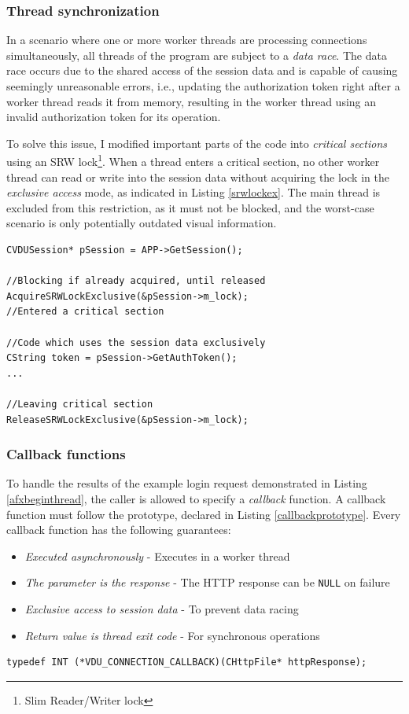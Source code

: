 \subsubsection{Thread synchronization}
In a scenario where one or more worker threads are processing connections simultaneously, all threads of the program are subject to a \textit{data race}. The data race occurs due to the shared access of the session data and is capable of causing seemingly unreasonable errors, i.e., updating the authorization token right after a worker thread reads it from memory, resulting in the worker thread using an invalid authorization token for its operation.

To solve this issue, I modified important parts of the code into \textit{critical sections} using an SRW lock\footnote{Slim Reader/Writer lock}. When a thread enters a critical section, no other worker thread can read or write into the session data without acquiring the lock in the \textit{exclusive access} mode, as indicated in Listing \ref{srwlockex}. The main thread is excluded from this restriction, as it must not be blocked, and the worst-case scenario is only potentially outdated visual information.

\begin{lstlisting}[caption={Example of a critical section implementation using an SRW lock.}, label=srwlockex]
CVDUSession* pSession = APP->GetSession();

//Blocking if already acquired, until released
AcquireSRWLockExclusive(&pSession->m_lock);
//Entered a critical section

//Code which uses the session data exclusively
CString token = pSession->GetAuthToken();
...

//Leaving critical section
ReleaseSRWLockExclusive(&pSession->m_lock);
\end{lstlisting}

\subsubsection{Callback functions}
To handle the results of the example login request demonstrated in Listing \ref{afxbeginthread}, the caller is allowed to specify a \textit{callback} function. A callback function must follow the prototype, declared in Listing \ref{callbackprototype}. Every callback function has the following guarantees:
\begin{itemize}
    \item \textit{Executed asynchronously} - Executes in a worker thread 
    \item \textit{The parameter is the response} - The HTTP response can be \lstinline{NULL} on failure
    \item \textit{Exclusive access to session data} - To prevent data racing
    \item \textit{Return value is thread exit code} - For synchronous operations
\end{itemize}
\begin{lstlisting}[caption={The prototype of a VDU callback function.}, label=callbackprototype]
typedef INT (*VDU_CONNECTION_CALLBACK)(CHttpFile* httpResponse);
\end{lstlisting}

